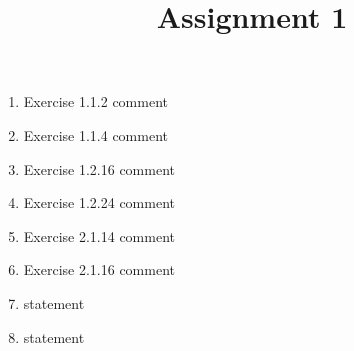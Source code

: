 \documentclass[12pt, letterpaper]{../homework}
\title{Assignment 1}
\newcommand{\bookproblem}[4]{\item Exercise #1.#2.#3 {comment}}
\newcommand{\extrahwproblem}[1]{\item {statement}}
\begin{document}
  \maketitle

  \begin{enumerate}
    
    \bookproblem{1}{1}{2}{../../book-problems/1/1/2}
    \bookproblem{1}{1}{4}{../../book-problems/1/1/4}
    \bookproblem{1}{2}{16}{../../book-problems/1/2/16}
    \bookproblem{1}{2}{24}{../../book-problems/1/2/24}
    \bookproblem{2}{1}{14}{../../book-problems/2/1/14}
    \bookproblem{2}{1}{16}{../../book-problems/2/1/16}
    \extrahwproblem{../../extra-hw-problems/silly/poll}
    \extrahwproblem{../../extra-hw-problems/silly/potato}
  \end{enumerate}
\end{document}
